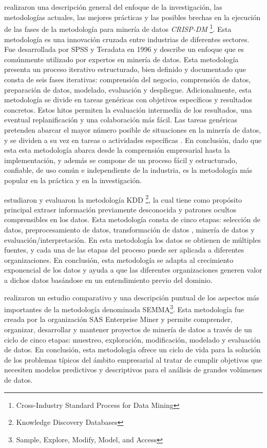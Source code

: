 \\\\
\cite{Schroer2021} realizaron una descripción general del enfoque de la investigación, las metodologías actuales, las mejores prácticas y las posibles brechas en la ejecución de las fases de la metodología para minería de datos \textit{CRISP-DM} \footnote{Cross-Industry Standard Process for Data Mining }. Esta metodología es una innovación cruzada entre industrias de diferentes sectores. Fue desarrollada por SPSS y Teradata en 1996 y describe un enfoque que es comúnmente utilizado por expertos en minería de datos. Esta metodología presenta un proceso iterativo estructurado, bien definido y documentado que consta de seis fases iterativas: comprensión del negocio, comprensión de datos, preparación de datos, modelado, evaluación y despliegue. Adicionalmente, esta metodología se divide en tareas genéricas con objetivos específicos y resultados concretos. Estos hitos permiten la evaluación intermedia de los resultados, una eventual replanificación y una colaboración más fácil. Las tareas genéricas pretenden abarcar el mayor número posible de situaciones en la minería de datos, y se dividen a su vez en tareas o actividades específicas \cite{Mladenic2012}. En conclusión, dado que esta esta metodología abarca desde la comprensión empresarial hasta la implementación, y además se compone de un proceso fácil y estructurado, confiable, de uso común e independiente de la industria, es la metodología más popular en la práctica y en la investigación.

\cite{Safhi2019} estudiaron y evaluaron la metodología KDD \footnote{Knowledge Discovery Databases}, la cual tiene como propósito principal extraer información previamente desconocida y patrones ocultos comprensibles en los datos. Esta metodología consta de cinco etapas: selección de datos,  preprocesamiento de datos, transformación de datos , minería de datos y evaluación/interpretación. En esta metodología los datos se obtienen de múltiples fuentes, y cada una de las etapas del proceso puede ser aplicada a diferentes organizaciones. En conclusión, esta metodología se adapta al crecimiento exponencial de los datos y ayuda a que las diferentes organizaciones generen valor a dichos datos basándose en un entendimiento previo del dominio.

\cite{Shafique2014} realizaron un estudio comparativo y una descripción puntual de los aspectos más importantes de la metodología denominada SEMMA\footnote{Sample, Explore, Modify, Model, and Access}. Esta metodología fue creada por la organización SAS Enterprise Miner y permite comprender, organizar, desarrollar y mantener proyectos de minería de datos a través de un ciclo de cinco etapas: muestreo, exploración, modificación, modelado y evaluación de datos.  En conclusión, esta metodología ofrece un ciclo de vida para la solución de los problemas típicos del ámbito empresarial al tratar de cumplir objetivos que necesiten modelos predictivos y descriptivos para el análisis de grandes volúmenes de datos.

